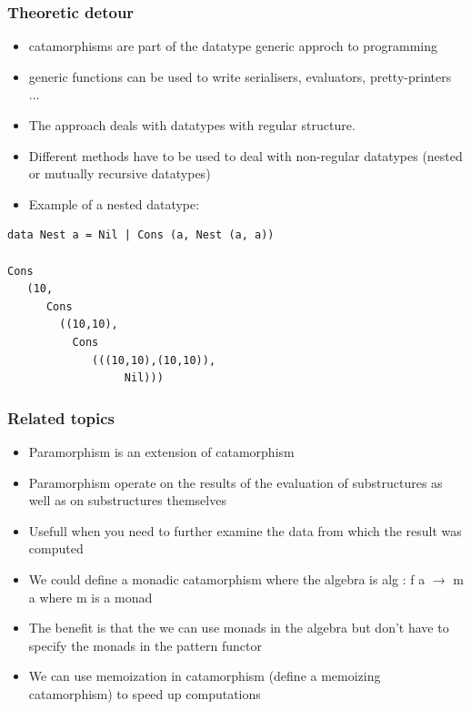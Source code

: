 \documentclass[10pt]{beamer}
\begin{document}
\begin{frame}[fragile]
\frametitle{Theoretic detour}

\begin{itemize}
\item catamorphisms are part of the datatype generic approch to programming 
\item generic functions can be used to write serialisers, evaluators, pretty-printers ... 
\item The approach deals with datatypes with regular structure.
\item Different methods have to be used to deal with non-regular datatypes (nested or mutually recursive datatypes) 	
\item Example of a nested datatype:	
\end{itemize}

\begin{lstlisting}
data Nest a = Nil | Cons (a, Nest (a, a))

Cons 
   (10,
      Cons 
        ((10,10),
          Cons 
             (((10,10),(10,10)),
                  Nil)))
\end{lstlisting}

\end{frame}




\begin{frame}[fragile]
\frametitle{Related topics}

\begin{itemize}
\item Paramorphism is an extension of catamorphism
\item Paramorphism operate on the results of the evaluation of substructures as well as on substructures themselves	
\item Usefull when you need to further examine the data from which the result was computed	
\item We could define a monadic catamorphism where the algebra is alg : f a $\rightarrow$ m a where m is a monad 
\item The benefit is that the we can use monads in the algebra but don't have to specify the monads in the pattern functor
\item We can use memoization in catamorphism (define a memoizing catamorphism) to speed up computations
\end{itemize}

\end{frame}
\end{document}
